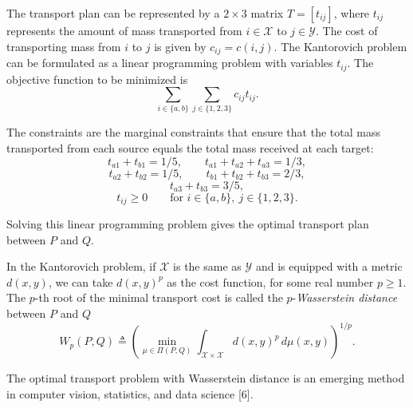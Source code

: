 The transport plan can be represented by a $2\times 3$ matrix $T=[t_{ij}]$, where $t_{ij}$ represents the amount of mass transported from $i\in \mathcal{X}$ to $j\in \mathcal{Y}$. The cost of transporting mass from $i$ to $j$ is given by $c_{ij}=c(i,j)$. The Kantorovich problem can be formulated as a linear programming problem with variables $t_{ij}$. The objective function to be minimized is
\[
\sum_{i\in \{a,b\}}\sum_{j\in \{1,2,3\}} c_{ij}t_{ij}.
\]

The constraints are the marginal constraints that ensure that the total mass transported from each source equals the total mass received at each target:
\[
t_{a1}+t_{b1}=1/5, \qquad t_{a1}+t_{a2}+t_{a3}=1/3,
\]
\[
t_{a2}+t_{b2}=1/5, \qquad t_{b1}+t_{b2}+t_{b3}=2/3,
\]
\[
t_{a3}+t_{b3}=3/5,
\]
\[
t_{ij}\ge 0 \qquad \text{for } i\in \{a,b\},\ j\in \{1,2,3\}.
\]

Solving this linear programming problem gives the optimal transport plan between $P$ and $Q$.

In the Kantorovich problem, if $\mathcal{X}$ is the same as $\mathcal{Y}$ and is equipped with a metric $d(x,y)$, we can take $d(x,y)^p$ as the cost function, for some real number $p\ge 1$. The $p$-th root of the minimal transport cost is called the $p$-\textit{Wasserstein distance} between $P$ and $Q$
\[
W_p(P,Q)\triangleq \left( \min_{\mu\in \Pi(P,Q)} \int_{\mathcal{X}\times \mathcal{X}} d(x,y)^p\, d\mu(x,y) \right)^{1/p}.
\]

The optimal transport problem with Wasserstein distance is an emerging method in computer vision, statistics, and data science [6].
